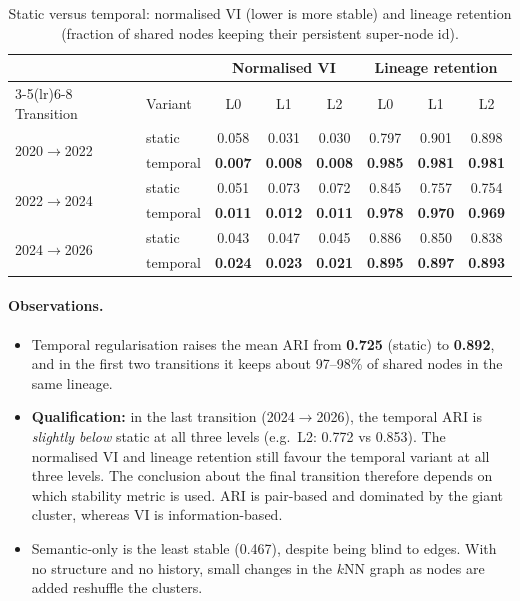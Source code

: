 \documentclass[11pt,a4paper]{article}
\theoremstyle{remark}
\begin{document}
\begin{table}[!htbp]
\centering
\caption{Static versus temporal: normalised VI (lower is more stable) and lineage retention
(fraction of shared nodes keeping their persistent super-node id).}
\label{tab:vi-lineage}
\small
\begin{tabular}{llcccccc}
\toprule
& & \multicolumn{3}{c}{Normalised VI} & \multicolumn{3}{c}{Lineage retention}\\
\cmidrule(lr){3-5}\cmidrule(lr){6-8}
Transition & Variant & L0 & L1 & L2 & L0 & L1 & L2\\
\midrule
\multirow{2}{*}{2020$\to$2022} & static & 0.058 & 0.031 & 0.030 & 0.797 & 0.901 & 0.898\\
 & temporal & \textbf{0.007} & \textbf{0.008} & \textbf{0.008} & \textbf{0.985} & \textbf{0.981} & \textbf{0.981}\\
\midrule
\multirow{2}{*}{2022$\to$2024} & static & 0.051 & 0.073 & 0.072 & 0.845 & 0.757 & 0.754\\
 & temporal & \textbf{0.011} & \textbf{0.012} & \textbf{0.011} & \textbf{0.978} & \textbf{0.970} & \textbf{0.969}\\
\midrule
\multirow{2}{*}{2024$\to$2026} & static & 0.043 & 0.047 & 0.045 & 0.886 & 0.850 & 0.838\\
 & temporal & \textbf{0.024} & \textbf{0.023} & \textbf{0.021} & \textbf{0.895} & \textbf{0.897} & \textbf{0.893}\\
\bottomrule
\end{tabular}
\end{table}

\paragraph{Observations.}
\begin{itemize}
  \item Temporal regularisation raises the mean ARI from \textbf{0.725} (static) to
        \textbf{0.892}, and in the first two transitions it keeps about 97--98\% of shared nodes
        in the same lineage.
  \item \textbf{Qualification:} in the last transition (2024$\to$2026), the temporal ARI is
        \emph{slightly below} static at all three levels (e.g.\ L2: 0.772 vs 0.853). The
        normalised VI and lineage retention still favour the temporal variant at all three
        levels. The conclusion about the final transition therefore depends on which stability
        metric is used. ARI is pair-based and dominated by the giant cluster, whereas VI is
        information-based.
  \item Semantic-only is the least stable (0.467), despite being blind to edges. With no
        structure and no history, small changes in the $k$NN graph as nodes are added
        reshuffle the clusters.
\end{itemize}
\end{document}
